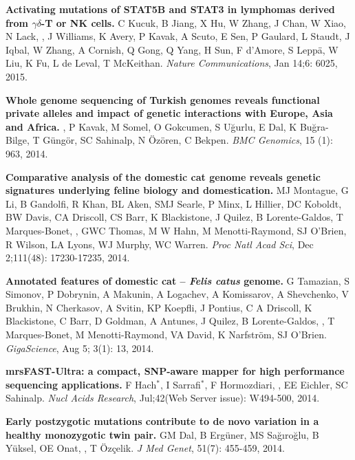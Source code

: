 \vspace{-.2cm}        
    {\bf Activating mutations of STAT5B and STAT3 in lymphomas derived from $\gamma\delta$-T or NK cells.}
    C Kucuk, B Jiang, X Hu, W Zhang, J Chan, W Xiao, N Lack,   \calkan{},  J Williams, K Avery, P Kavak, A Scuto, E Sen,  P Gaulard, L Staudt, J Iqbal,  W Zhang,  A Cornish, Q Gong, Q  Yang, H Sun, F d'Amore, S Leppä, W Liu, K Fu, L de Leval, T McKeithan.
    {\em Nature Communications}, Jan 14;6: 6025, 2015.


\vspace{-.2cm}        
    {\bf Whole genome sequencing of Turkish genomes reveals functional private alleles and impact of genetic interactions with Europe, Asia and Africa.}
    \calkan{}, P Kavak, M Somel, O Gokcumen, S Uğurlu, E Dal, K Buğra-Bilge,  T Güngör, SC Sahinalp, N Özören, C Bekpen.
    {\em BMC Genomics}, 15 (1): 963, 2014.

\vspace{-.2cm}        
    {\bf Comparative analysis of the domestic cat genome reveals genetic signatures underlying feline biology and domestication.}
    MJ Montague, G Li, B Gandolfi, R Khan, BL Aken, SMJ Searle, P Minx, L Hillier, DC Koboldt, BW Davis, CA Driscoll, CS Barr, K Blackistone, J Quilez, B Lorente-Galdos, T Marques-Bonet, \calkan{}, GWC Thomas, M W Hahn, M Menotti-Raymond, SJ O’Brien, R Wilson, LA Lyons, WJ Murphy, WC Warren. 
    {\em Proc Natl Acad Sci}, Dec 2;111(48): 17230-17235, 2014.

\vspace{-.2cm}        
    {\bf Annotated features of domestic cat – \textit{Felis catus} genome.}
    G Tamazian, S Simonov, P Dobrynin, A Makunin, A Logachev, A Komissarov, A Shevchenko, V Brukhin, N Cherkasov, A Svitin, KP Koepfli, J Pontius, C A Driscoll, K Blackistone, C Barr, D Goldman, A Antunes, J Quilez, B Lorente-Galdos,  \calkan{}, T Marques-Bonet, M Menotti-Raymond, VA David, K Narfström, SJ O’Brien.
    {\em GigaScience}, Aug 5; 3(1): 13, 2014.
                   
\vspace{-.2cm}        
    {\bf mrsFAST-Ultra: a compact, SNP-aware mapper for high performance sequencing applications.}
    F Hach$^\ast$, I Sarrafi$^\ast$, F Hormozdiari, \calkan{}, EE Eichler, SC Sahinalp. 
    {\em Nucl Acids Research}, Jul;42(Web Server issue): W494-500, 2014.
    
\vspace{-.2cm}        
    {\bf Early postzygotic mutations contribute to de novo variation in a healthy monozygotic twin pair.}
    GM Dal, B Ergüner, MS Sağıroğlu, B Yüksel, OE Onat, \calkan{}, T Özçelik. 
    {\em J Med Genet}, 51(7): 455-459, 2014.



